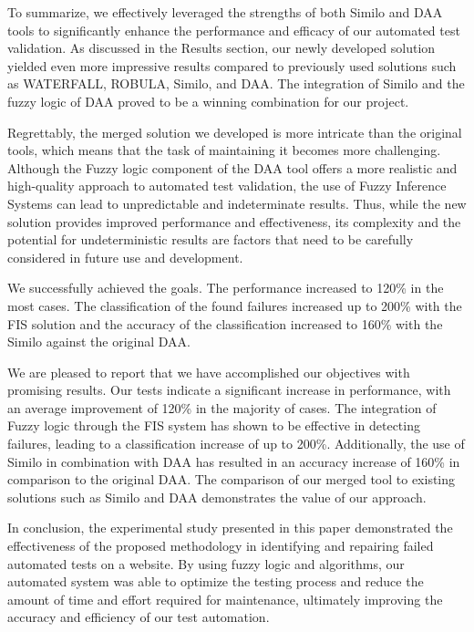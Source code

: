 \documentclass{article}
\begin{document}
To summarize, we effectively leveraged the strengths of both Similo\cite{similo} and DAA\cite{fuzzy_ai_in_web_testing} tools to significantly enhance the performance and efficacy of our automated test validation. As discussed in the Results section, our newly developed solution yielded even more impressive results compared to previously used solutions such as WATERFALL\cite{waterfall}, ROBULA\cite{robula}, Similo\cite{similo}, and DAA\cite{fuzzy_ai_in_web_testing}. The integration of Similo\cite{similo} and the fuzzy logic of DAA\cite{fuzzy_ai_in_web_testing} proved to be a winning combination for our project.

Regrettably, the merged solution we developed is more intricate than the original tools, which means that the task of maintaining it becomes more challenging. Although the Fuzzy logic component of the DAA\cite{fuzzy_ai_in_web_testing} tool offers a more realistic and high-quality approach to automated test validation, the use of Fuzzy Inference Systems can lead to unpredictable and indeterminate results. Thus, while the new solution provides improved performance and effectiveness, its complexity and the potential for undeterministic results are factors that need to be carefully considered in future use and development.

We successfully achieved the goals. The performance increased to 120\% in the most cases. The classification of the found failures increased up to 200\% with the FIS solution and the accuracy of the classification increased to 160\% with the Similo\cite{similo} against the original DAA\cite{fuzzy_ai_in_web_testing}.

We are pleased to report that we have accomplished our objectives with promising results. Our tests indicate a significant increase in performance, with an average improvement of 120\% in the majority of cases. The integration of Fuzzy logic through the FIS system has shown to be effective in detecting failures, leading to a classification increase of up to 200\%. Additionally, the use of Similo\cite{similo} in combination with DAA has resulted in an accuracy increase of 160\% in comparison to the original DAA\cite{fuzzy_ai_in_web_testing}. The comparison of our merged tool to existing solutions such as Similo\cite{similo} and DAA\cite{fuzzy_ai_in_web_testing} demonstrates the value of our approach.

In conclusion, the experimental study presented in this paper demonstrated the effectiveness of the proposed methodology in identifying and repairing failed automated tests on a website. By using fuzzy logic\cite{fuzzy_logic} and algorithms, our automated system was able to optimize the testing process and reduce the amount of time and effort required for maintenance, ultimately improving the accuracy and efficiency of our test automation.
\end{document}
